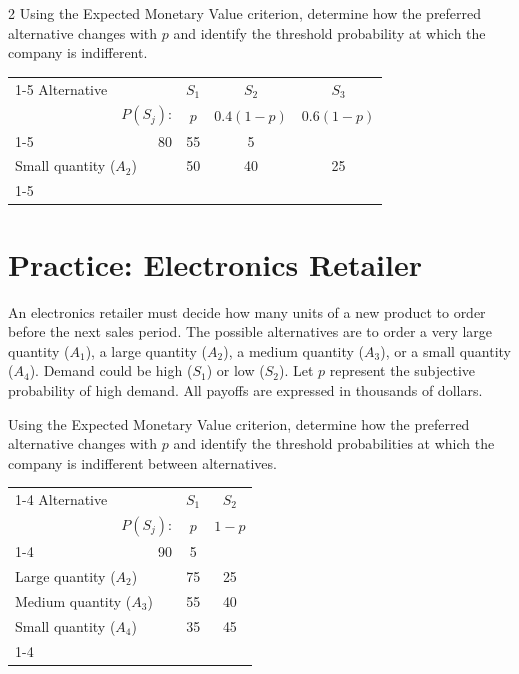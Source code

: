 \begin{multicols}{2}
	Using the Expected Monetary Value criterion, determine how the preferred
	alternative changes with $p$ and identify the threshold probability at
	which the company is indifferent.
	
	\vspace{-3mm}
	
	\begin{center}
		\renewcommand{\arraystretch}{1.3}
		\small
		\begin{tabular}{lr@{\qquad}ccc}
			\cmidrule{1-5}
			Alternative & & $S_1$ & $S_2$ & $S_3$ \\
			& $P(S_j)$: & $p$ & $0.4(1-p)$ & $0.6(1-p)$ \\
			\cmidrule{1-5}
			\multicolumn{2}{l}{Large quantity ($A_1$)} & 80 & 55 & 5 \\
			\multicolumn{2}{l}{Small quantity ($A_2$)} & 50 & 40 & 25 \\
			\cmidrule{1-5}
		\end{tabular}
	\end{center}
	
	\section{Practice: Electronics Retailer}
	
	An electronics retailer must decide how many units of a new product
	to order before the next sales period. The possible alternatives are to
	order a very large quantity ($A_1$), a large quantity ($A_2$), a medium quantity
	($A_3$), or a small quantity ($A_4$). Demand could be high ($S_1$) or
	low ($S_2$). Let $p$ represent the subjective probability of high demand.
	All payoffs are expressed in thousands of dollars.
	
	Using the Expected Monetary Value criterion, determine how the preferred
	alternative changes with $p$ and identify the threshold probabilities at
	which the company is indifferent between alternatives.
	
	\vspace{-3mm}
	
	\begin{center}
		\renewcommand{\arraystretch}{1.3}
		\small
		\begin{tabular}{lr@{\qquad}cc}
			\cmidrule{1-4}
			Alternative & & $S_1$ & $S_2$ \\
			& $P(S_j)$: & $p$ & $1-p$ \\
			\cmidrule{1-4}
			\multicolumn{2}{l}{Very large quantity ($A_1$)} & 90 & 5 \\
			\multicolumn{2}{l}{Large quantity ($A_2$)} & 75 & 25 \\
			\multicolumn{2}{l}{Medium quantity ($A_3$)} & 55 & 40 \\
			\multicolumn{2}{l}{Small quantity ($A_4$)} & 35 & 45 \\
			\cmidrule{1-4}
		\end{tabular}
	\end{center}
	

\end{multicols}
